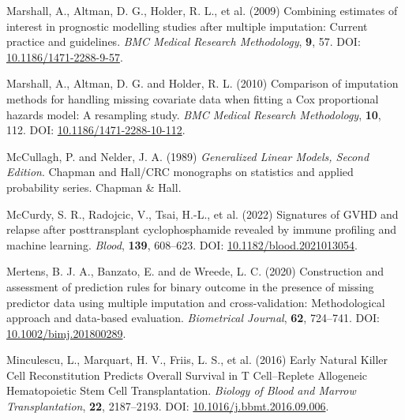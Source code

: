 \documentclass[
  letterpaper,
  DIV=11,
  numbers=noendperiod]{scrreprt}
\newlength{\cslhangindent}
\newlength{\cslentryspacingunit} %
\newenvironment{CSLReferences}[2] %
 {%
  \setlength{\parindent}{0pt}
  \ifodd #1
  \let\oldpar\par
  \def\par{\hangindent=\cslhangindent\oldpar}
  \fi
  \setlength{\parskip}{#2\cslentryspacingunit}
 }%
 {}
\begin{document}
\begin{CSLReferences}{1}{0}
\leavevmode{}%
Marshall, A., Altman, D. G., Holder, R. L., et al. (2009) Combining
estimates of interest in prognostic modelling studies after multiple
imputation: Current practice and guidelines. \emph{BMC Medical Research
Methodology}, \textbf{9}, 57. DOI:
\href{https://doi.org/10.1186/1471-2288-9-57}{10.1186/1471-2288-9-57}.

\leavevmode{}%
Marshall, A., Altman, D. G. and Holder, R. L. (2010) Comparison of
imputation methods for handling missing covariate data when fitting a
{Cox} proportional hazards model: A resampling study. \emph{BMC Medical
Research Methodology}, \textbf{10}, 112. DOI:
\href{https://doi.org/10.1186/1471-2288-10-112}{10.1186/1471-2288-10-112}.

\leavevmode{}%
McCullagh, P. and Nelder, J. A. (1989) \emph{Generalized Linear Models,
Second Edition}. Chapman and {Hall}/{CRC} monographs on statistics and
applied probability series. Chapman \& Hall.

\leavevmode{}%
McCurdy, S. R., Radojcic, V., Tsai, H.-L., et al. (2022) Signatures of
{GVHD} and relapse after posttransplant cyclophosphamide revealed by
immune profiling and machine learning. \emph{Blood}, \textbf{139},
608--623. DOI:
\href{https://doi.org/10.1182/blood.2021013054}{10.1182/blood.2021013054}.

\leavevmode{}%
Mertens, B. J. A., Banzato, E. and de Wreede, L. C. (2020) Construction
and assessment of prediction rules for binary outcome in the presence of
missing predictor data using multiple imputation and cross-validation:
{Methodological} approach and data-based evaluation. \emph{Biometrical
Journal}, \textbf{62}, 724--741. DOI:
\href{https://doi.org/10.1002/bimj.201800289}{10.1002/bimj.201800289}.

\leavevmode{}%
Minculescu, L., Marquart, H. V., Friis, L. S., et al. (2016) Early
{Natural Killer Cell Reconstitution Predicts Overall Survival} in {T
Cell}--{Replete Allogeneic Hematopoietic Stem Cell Transplantation}.
\emph{Biology of Blood and Marrow Transplantation}, \textbf{22},
2187--2193. DOI:
\href{https://doi.org/10.1016/j.bbmt.2016.09.006}{10.1016/j.bbmt.2016.09.006}.


\end{CSLReferences}
\end{document}
